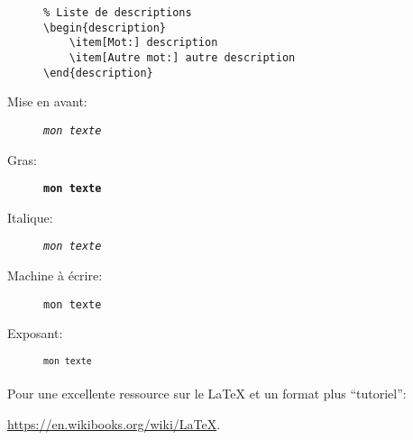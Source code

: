 \begin{description}
\begin{verbatim}
% Liste de descriptions
\begin{description}
	\item[Mot:] description
	\item[Autre mot:] autre description
\end{description}
		\end{verbatim}
	\item[Mise en avant:] \texttt{\emph{mon texte}}
	\item[Gras:] \texttt{\textbf{mon texte}}
	\item[Italique:] \texttt{\textit{mon texte}}
	\item[Machine à écrire:] \texttt{\texttt{mon texte}}
	\item[Exposant:] \texttt{\textsuperscript{mon texte}}
\end{description}

\paragraph{} Pour une excellente ressource sur le \LaTeX{} et un format plus
``tutoriel'':

\url{https://en.wikibooks.org/wiki/LaTeX}.
